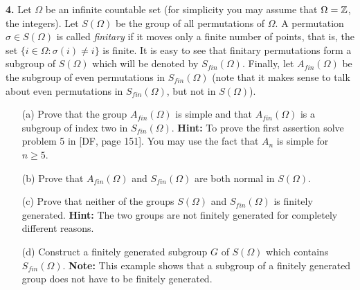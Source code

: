 \documentclass[12pt]{amsart}
\begin{document}
{\bf 4.} Let $\Omega$ be an infinite countable set (for simplicity you may assume that $\Omega={\mathbb Z}$,
the integers). Let $S(\Omega)$ be the group of all permutations of $\Omega$.
A permutation $\sigma\in S(\Omega)$ is called {\it finitary} if it moves
only a finite number of points, that is, the set $\{i\in\Omega : \sigma(i)\neq i\}$
is finite. It is easy to see that finitary permutations form a subgroup of $S(\Omega)$
which will be denoted by $S_{fin}(\Omega)$. Finally, let $A_{fin}(\Omega)$ be the subgroup
of even permutations in $S_{fin}(\Omega)$ (note that it makes sense to talk about
even permutations in $S_{fin}(\Omega)$, but not in $S(\Omega)$).
\begin{itemize}
\item[(a)] Prove that the group $A_{fin}(\Omega)$ is simple and that $A_{fin}(\Omega)$
is a subgroup of index two in $S_{fin}(\Omega)$. {\bf Hint:} To prove the first
assertion solve problem 5 in [DF, page 151]. You may use the fact that $A_n$ is simple for $n\geq 5$.
\item[(b)] Prove that $A_{fin}(\Omega)$ and $S_{fin}(\Omega)$ are both normal in $S(\Omega)$.
\item[(c)] Prove that neither of the groups $S(\Omega)$ and $S_{fin}(\Omega)$ is finitely generated. {\bf Hint:} The two groups are not finitely generated for completely
different reasons.
\item[(d)] Construct a finitely generated subgroup $G$ of $S(\Omega)$ which contains
$S_{fin}(\Omega)$. {\bf Note:} This example shows that a subgroup of a finitely
generated group does not have to be finitely generated.
\end{itemize}
\end{document}
